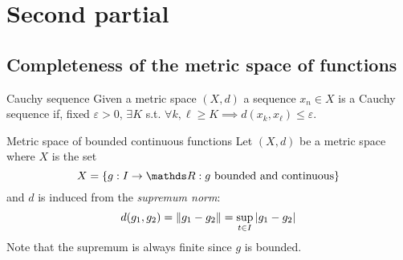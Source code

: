 \documentclass[12pt]{extarticle}
\numberwithin{equation}{section}
\begin{document}
\section{Second partial}

\subsection{Completeness of the metric space of functions}

\begin{definition}{Cauchy sequence}{}
  Given a metric space $(X, d)$ a sequence $x_n \in X$ is a Cauchy sequence if,
  fixed $\varepsilon > 0$,
  $\exists K$ s.t. $\forall k, \ell \geq K
  \implies d(x_k, x_\ell) \leq \varepsilon$.
\end{definition}

\begin{definition}{Metric space of bounded continuous functions}{}
    Let $(X, d)$ be a metric space where $X$ is the set
    \begin{equation}
        X = \{ g:I \to \R : g \text{ bounded and continuous} \}
    \end{equation}
    and $d$ is induced from the \emph{supremum norm}:
    \begin{equation}
        d(g_1, g_2) = \norm{g_1 - g_2} = \sup_{t \in I} \abs{g_1 - g_2}
    \end{equation}
    Note that the supremum is always finite since $g$ is bounded.
\end{definition}
\end{document}
